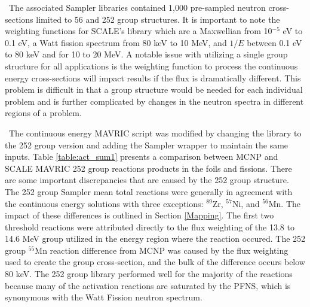 \ The associated Sampler libraries contained 1,000 pre-sampled neutron cross-sections limited to 56 and 252 group structures. 
It is important to note the weighting functions for SCALE's library which are a Maxwellian from 10$^{-5}$ eV to 0.1 eV, a Watt fission spectrum from 80 keV to 10 MeV, and $1/E$ between 0.1 eV to 80 keV and for 10 to 20 MeV.  
A notable issue with utilizing a single group structure for all applications is the weighting function to process the continuous energy cross-sections will impact results if the flux is dramatically different. 
This problem is difficult in that a group structure would be needed for each individual problem and is further complicated by changes in the neutron spectra in different regions of a problem. 

\ The continuous energy MAVRIC script was modified by changing the library to the 252 group version and adding the Sampler wrapper to maintain the same inputs. 
Table \ref{table:act_sum1} presents a comparison between MCNP and SCALE MAVRIC 252 group reactions products in the foils and fissions.
There are some important discrepancies that are caused by the 252 group structure. 
The 252 group Sampler mean total reactions were generally in agreement with the continuous energy solutions with three exceptions: $\mathrm{^{89}}$Zr, $\mathrm{^{57}}$Ni, and $\mathrm{^{56}}$Mn. 
The impact of these differences is outlined in Section \ref{Mapping}.
The first two threshold reactions were attributed directly to the flux weighting of the 13.8 to 14.6 MeV group utilized in the energy region where the reaction occured. 
The 252 group $\mathrm{^{55}}$Mn reaction difference from MCNP was caused by the flux weighting used to create the group cross-section, and the bulk of the difference occurs below 80 keV.   
The 252 group library performed well for the majority of the reactions because many of the activation reactions are saturated by the PFNS, which is synonymous with the Watt Fission neutron spectrum. 

